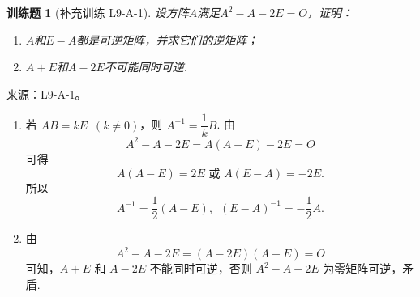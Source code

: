 \documentclass[12pt,fontset=fandol]{ctexart}
\newtheorem{exercise}{训练题}[section]
\begin{document}
\begin{exercise}[补充训练 L9-A-1]\label{prob:L9-A-1}
设方阵$A$满足$A^2-A-2E=O$，证明：
        \begin{enumerate}
            \item $A$和$E-A$都是可逆矩阵，并求它们的逆矩阵；

            \item $A+E$和$A-2E$不可能同时可逆.
        \end{enumerate}
\end{exercise}
\noindent 来源：\href{https://github.com/yhwu-is/Linear-Algebra-Left-Undone/blob/new/%E8%AE%B2%E4%B9%89/%E4%B8%93%E9%A2%98/9%20%E7%9F%A9%E9%98%B5%E8%BF%90%E7%AE%97%E8%BF%9B%E9%98%B6.tex}{L9-A-1}。
\begin{solve}
\begin{enumerate}
                \item 若 $ AB = kE \enspace(k \neq 0) $，则 $ A^{-1} = \dfrac{1}{k} B $. 由
                      \[ A^2 - A - 2E = A(A - E) - 2E = O \]
                      可得
                      \[ A(A - E) = 2E \text{~或~} A(E - A) = -2E. \]
                      所以
                      \[ A^{-1} = \frac{1}{2}(A-E),\enspace (E - A)^{-1} = -\frac{1}{2}A. \]

                \item 由
                      \[  A^2 - A - 2E = (A - 2E)(A + E) = O \]
                      可知，$ A + E $ 和 $ A - 2E $ 不能同时可逆，否则 $ A^2 - A - 2E $ 为零矩阵可逆，矛盾.
            \end{enumerate}
\end{solve}
\end{document}
